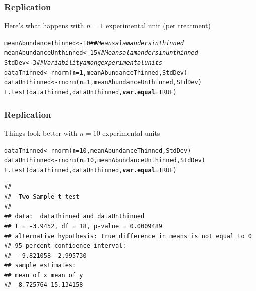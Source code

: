 \documentclass[color=usenames,dvipsnames]{beamer}\usepackage[]{graphicx}\usepackage[]{xcolor}
\makeatletter
\newcommand{\hlnum}[1]{\textcolor[rgb]{0.69,0.494,0}{#1}}%
\newcommand{\hlcom}[1]{\textcolor[rgb]{0.514,0.506,0.514}{\textit{#1}}}%
\newcommand{\hlstd}[1]{\textcolor[rgb]{0,0,0}{#1}}%
\newcommand{\hlkwb}[1]{\textcolor[rgb]{0,0.341,0.682}{#1}}%
\newcommand{\hlkwc}[1]{\textcolor[rgb]{0,0,0}{\textbf{#1}}}%
\newcommand{\hlkwd}[1]{\textcolor[rgb]{0.004,0.004,0.506}{#1}}%
\newenvironment{kframe}{%
 \def\at@end@of@kframe{}%
 \ifinner\ifhmode%
  \def\at@end@of@kframe{\end{minipage}}%
  \begin{minipage}{\columnwidth}%
 \fi\fi%
 \def\FrameCommand##1{\hskip\@totalleftmargin \hskip-\fboxsep
 \colorbox{shadecolor}{##1}\hskip-\fboxsep
     \hskip-\linewidth \hskip-\@totalleftmargin \hskip\columnwidth}%
 \MakeFramed {\advance\hsize-\width
   \@totalleftmargin\z@ \linewidth\hsize
   \@setminipage}}%
 {\par\unskip\endMakeFramed%
 \at@end@of@kframe}
\newenvironment{knitrout}{}{} %
\makeatother
\begin{document}
\begin{frame}[fragile]
  \frametitle{Replication}
  Here's what happens with $n=1$ experimental unit (per treatment) \\
\begin{knitrout}\scriptsize
{}\color{fgcolor}\begin{kframe}
\begin{alltt}
\hlstd{meanAbundanceThinned} \hlkwb{<-} \hlnum{10}      \hlcom{## Mean salamanders in thinned}
\hlstd{meanAbundanceUnthinned} \hlkwb{<-} \hlnum{15}    \hlcom{## Mean salamanders in unthinned}
\hlstd{StdDev} \hlkwb{<-} \hlnum{3}                     \hlcom{## Variability among experimental units}
\hlstd{dataThinned} \hlkwb{<-} \hlkwd{rnorm}\hlstd{(}\hlkwc{n}\hlstd{=}\hlnum{1}\hlstd{, meanAbundanceThinned, StdDev)}
\hlstd{dataUnthinned} \hlkwb{<-} \hlkwd{rnorm}\hlstd{(}\hlkwc{n}\hlstd{=}\hlnum{1}\hlstd{, meanAbundanceUnthinned, StdDev)}
\hlkwd{t.test}\hlstd{(dataThinned, dataUnthinned,} \hlkwc{var.equal}\hlstd{=}\hlnum{TRUE}\hlstd{)}
\end{alltt}


{\ttfamily\noindent\bfseries\color{errorcolor}{\#\# Error in t.test.default(dataThinned, dataUnthinned, var.equal = TRUE): not enough observations}}\end{kframe}
\end{knitrout}
\end{frame}




\begin{frame}[fragile]
  \frametitle{Replication}
  Things look better with $n=10$ experimental units \\
\begin{knitrout}\scriptsize
{}\color{fgcolor}\begin{kframe}
\begin{alltt}
\hlstd{dataThinned} \hlkwb{<-} \hlkwd{rnorm}\hlstd{(}\hlkwc{n}\hlstd{=}\hlnum{10}\hlstd{, meanAbundanceThinned, StdDev)}
\hlstd{dataUnthinned} \hlkwb{<-} \hlkwd{rnorm}\hlstd{(}\hlkwc{n}\hlstd{=}\hlnum{10}\hlstd{, meanAbundanceUnthinned, StdDev)}
\hlkwd{t.test}\hlstd{(dataThinned, dataUnthinned,} \hlkwc{var.equal}\hlstd{=}\hlnum{TRUE}\hlstd{)}
\end{alltt}
\begin{verbatim}
## 
## 	Two Sample t-test
## 
## data:  dataThinned and dataUnthinned
## t = -3.9452, df = 18, p-value = 0.0009489
## alternative hypothesis: true difference in means is not equal to 0
## 95 percent confidence interval:
##  -9.821058 -2.995730
## sample estimates:
## mean of x mean of y 
##  8.725764 15.134158
\end{verbatim}
\end{kframe}
\end{knitrout}
\end{frame}
\end{document}
